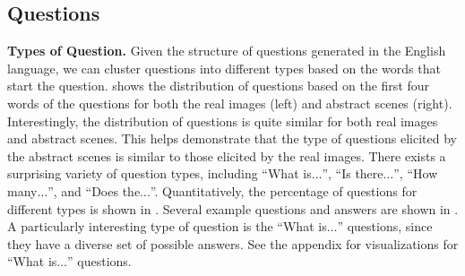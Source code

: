 

\subsection{Questions}

\textbf{Types of Question.}
Given the structure of questions generated in the English language,
we can cluster questions into different types based on the words that start the question.
 shows the distribution of questions based on the first four
words of the questions for both the real images (left) and abstract scenes (right).
Interestingly, the distribution of questions is quite similar for both real images and abstract scenes.
This helps demonstrate that the type of questions elicited by the abstract scenes is similar to
those elicited by the real images. There exists a surprising variety of question types,
including ``What is$\ldots$'', ``Is there$\ldots$'', ``How many$\ldots$'', and ``Does the$\ldots$''.
Quantitatively, the percentage of questions for different types is shown in . Several example questions and answers are shown in .
A particularly interesting type of question is the ``What is$\ldots$'' questions, since they have a
diverse set of possible answers. See the appendix for visualizations for ``What is$\ldots$'' questions.


